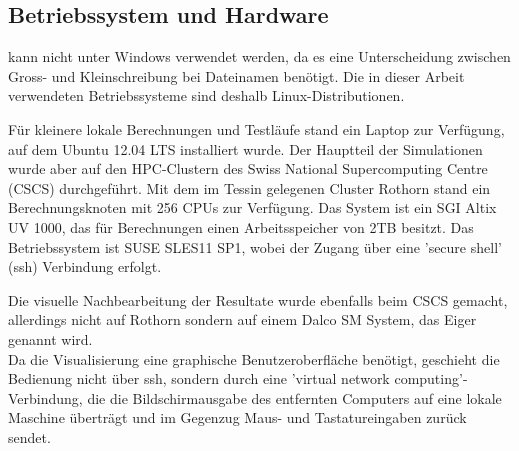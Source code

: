 \subsection{Betriebssystem und Hardware}
\label{Kapitel:Hardware}
\openfoam{} kann nicht unter Windows verwendet werden, da es eine Unterscheidung zwischen Gross- und Kleinschreibung bei Dateinamen benötigt. Die in dieser Arbeit verwendeten Betriebssysteme sind deshalb Linux-Distributionen.

Für kleinere lokale Berechnungen und Testläufe stand ein Laptop zur Verfügung, auf dem Ubuntu 12.04 LTS installiert wurde.
Der Hauptteil der Simulationen wurde aber auf den HPC-Clustern des Swiss National Supercomputing Centre (CSCS) durchgeführt.
Mit dem im Tessin gelegenen Cluster Rothorn stand ein Berechnungsknoten mit 256 CPUs zur Verfügung. Das System ist ein SGI Altix UV 1000, das für Berechnungen einen Arbeitsspeicher von 2TB besitzt.
Das Betriebssystem ist SUSE SLES11 SP1, wobei der Zugang über eine 'secure shell' (ssh) Verbindung erfolgt.

Die visuelle Nachbearbeitung der Resultate wurde ebenfalls beim CSCS gemacht, allerdings nicht auf Rothorn sondern auf einem Dalco SM System, das Eiger genannt wird.\\
Da die Visualisierung eine graphische Benutzeroberfläche benötigt, geschieht die Bedienung nicht über ssh, sondern durch eine 'virtual network computing'-Verbindung, die die Bildschirmausgabe des entfernten Computers auf eine lokale Maschine überträgt und im Gegenzug Maus- und Tastatureingaben zurück sendet.
